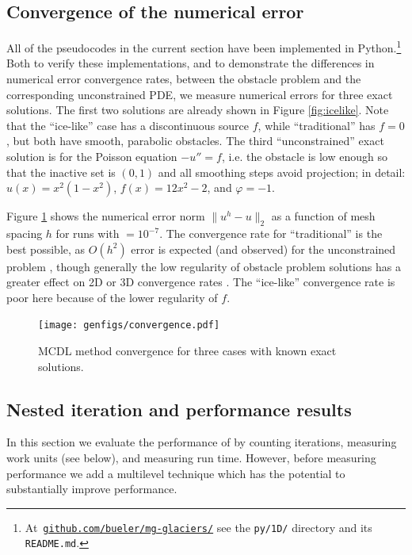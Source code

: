 \documentclass[letterpaper,final,12pt,reqno]{amsart}
\theoremstyle{claim}
\numberwithin{equation}{section}
\numberwithin{figure}{section}
\numberwithin{table}{section}
\numberwithin{theorem}{section}
\begin{document}
\subsection*{Convergence of the numerical error}  All of the pseudocodes in the current section have been implemented in Python.\footnote{At\, \href{https://github.com/bueler/mg-glaciers/}{\texttt{github.com/bueler/mg-glaciers/}} see the \texttt{py/1D/} directory and its \texttt{README.md}.}  Both to verify these implementations, and to demonstrate the differences in numerical error convergence rates, between the obstacle problem and the corresponding unconstrained PDE, we measure numerical errors for three exact solutions.  The first two solutions are already shown in Figure \ref{fig:icelike}.  Note that the ``ice-like'' case has a discontinuous source $f$, while ``traditional'' has $f=0$, but both have smooth, parabolic obstacles.  The third ``unconstrained'' exact solution is for the Poisson equation $-u''=f$, i.e. the obstacle is low enough so that the inactive set is $(0,1)$ and all smoothing steps avoid projection; in detail: $u(x) = x^2(1-x^2)$, $f(x) = 12 x^2-2$, and $\varphi=-1$.

Figure \ref{fig:convergence} shows the numerical error norm $\|u^h-u\|_2$ as a function of mesh spacing $h$ for runs with  $=10^{-7}$.  The convergence rate for ``traditional'' is the best possible, as $O(h^2)$ error is expected (and observed) for the unconstrained problem \cite{Elmanetal2014}, though generally the low regularity of obstacle problem solutions has a greater effect on 2D or 3D convergence rates \cite[Chapter 12]{Bueler2021}.  The ``ice-like'' convergence rate is poor here because of the lower regularity of $f$.

\begin{figure}
\texttt{[image: genfigs/convergence.pdf]}
\caption{MCDL method convergence for three cases with known exact solutions.}
\label{fig:convergence}
\end{figure}

\subsection*{Nested iteration and performance results}  In this section we evaluate the performance of  by counting iterations, measuring work units (see below), and measuring run time.  However, before measuring performance we add a multilevel technique which has the potential to substantially improve performance.
\end{document}
